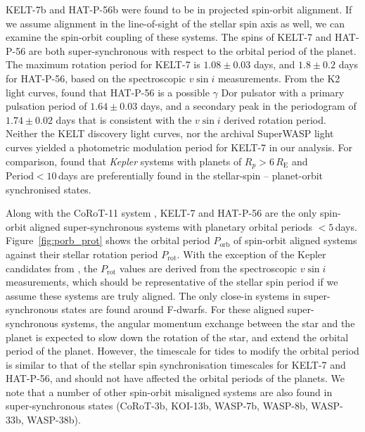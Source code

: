 \documentclass[useAMS,usenatbib]{mn2e}
\begin{document}
KELT-7b and HAT-P-56b were found to be in projected spin-orbit alignment. If we assume alignment in the line-of-sight of the stellar spin axis as well, we can examine the spin-orbit coupling of these systems. The spins of KELT-7 and HAT-P-56 are both super-synchronous with respect to the orbital period of the planet. The maximum rotation period for KELT-7 is $1.08\pm0.03$ days, and $1.8\pm0.2$ days for HAT-P-56, based on the spectroscopic $v \sin i$ measurements. From the K2 light curves, \citet{2015AJ....150...85H} found that HAT-P-56 is a possible $\gamma$ Dor pulsator with a primary pulsation period of $1.64\pm0.03$ days, and a secondary peak in the periodogram of $1.74\pm0.02$ days that is consistent with the $v\sin i$ derived rotation period. Neither the KELT discovery light curves, nor the archival SuperWASP light curves \citep{2010A&amp;A...520L..10B} yielded a photometric modulation period for KELT-7 in our analysis.  For comparison, \citet{2013MNRAS.436.1883W} found that \emph{Kepler} systems with planets of $R_p > 6 \,R_\text{E}$ and $\text{Period}<10$\,days are preferentially found in the stellar-spin -- planet-orbit synchronised states. 

Along with the CoRoT-11 system \citep{2010A&amp;A...524A..55G,2012A&amp;A...543L...5G}, KELT-7 and HAT-P-56 are the only spin-orbit aligned super-synchronous systems with planetary orbital periods $<5$\,days. Figure~\ref{fig:porb_prot} shows the orbital period $P_\text{orb}$ of spin-orbit aligned systems against their stellar rotation period $P_\text{rot}$. With the exception of the Kepler candidates from \citet{2013MNRAS.436.1883W}, the $P_\text{rot}$ values are derived from the spectroscopic $v\sin i$ measurements, which should be representative of the stellar spin period if we assume these systems are truly aligned. The only close-in systems in super-synchronous states are found around F-dwarfs. For these aligned super-synchronous systems, the angular momentum exchange between the star and the planet is expected to slow down the rotation of the star, and extend the orbital period of the planet. However, the timescale for tides to modify the orbital period is similar to that of the stellar spin synchronisation timescales \citep{2012ApJ...757....6H} for KELT-7 and HAT-P-56, and should not have affected the orbital periods of the planets. We note that a number of other spin-orbit misaligned systems are also found in super-synchronous states (CoRoT-3b, KOI-13b, WASP-7b, WASP-8b, WASP-33b, WASP-38b). 
\end{document}
